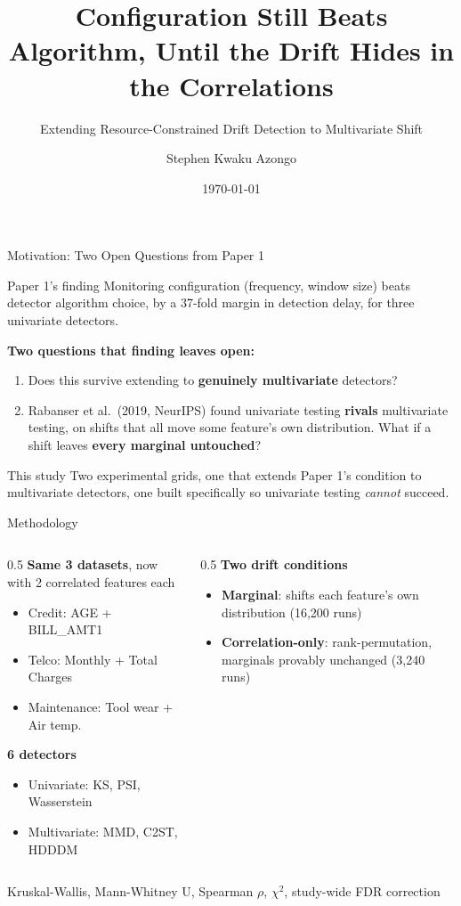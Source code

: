 \documentclass{beamer}
\title[Configuration vs. Detector Class]{Configuration Still Beats Algorithm, Until the Drift Hides in the Correlations}
\subtitle{Extending Resource-Constrained Drift Detection to Multivariate Shift}
\author{Stephen Kwaku Azongo}
\institute{Department of Computer Science, University of Ghana}
\date{\today}
\begin{document}
\frame{\titlepage}

\begin{frame}{Motivation: Two Open Questions from Paper 1}
\begin{block}{Paper 1's finding}
Monitoring configuration (frequency, window size) beats detector algorithm choice, by a 37-fold margin in detection delay, for three univariate detectors.
\end{block}
\vspace{0.5em}
\textbf{Two questions that finding leaves open:}
\begin{enumerate}
  \item Does this survive extending to \textbf{genuinely multivariate} detectors?
  \item Rabanser et al.\ (2019, NeurIPS) found univariate testing \textbf{rivals} multivariate testing, on shifts that all move some feature's own distribution. What if a shift leaves \textbf{every marginal untouched}?
\end{enumerate}
\vspace{0.5em}
\begin{block}{This study}
Two experimental grids, one that extends Paper 1's condition to multivariate detectors, one built specifically so univariate testing \emph{cannot} succeed.
\end{block}
\end{frame}

\begin{frame}{Methodology}
\begin{columns}[T]
\begin{column}{0.5\textwidth}
\textbf{Same 3 datasets}, now with 2 correlated features each
\begin{itemize}
  \item Credit: AGE + BILL\_AMT1
  \item Telco: Monthly + Total Charges
  \item Maintenance: Tool wear + Air temp.
\end{itemize}
\textbf{6 detectors}
\begin{itemize}
  \item Univariate: KS, PSI, Wasserstein
  \item Multivariate: MMD, C2ST, HDDDM
\end{itemize}
\end{column}
\begin{column}{0.5\textwidth}
\textbf{Two drift conditions}
\begin{itemize}
  \item \textbf{Marginal}: shifts each feature's own distribution (16{,}200 runs)
  \item \textbf{Correlation-only}: rank-permutation, marginals provably unchanged (3{,}240 runs)
\end{itemize}
\end{column}
\end{columns}
\vspace{1em}
\begin{center}
\small Kruskal-Wallis, Mann-Whitney U, Spearman $\rho$, $\chi^2$, study-wide FDR correction
\end{center}
\end{frame}
\end{document}

